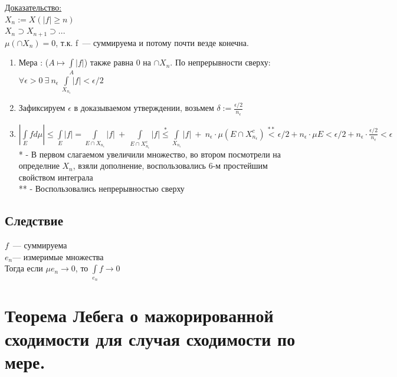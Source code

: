 \documentclass[paper=a4, fontsize=17pt]{article}
\begin{document}
\underline{Доказательство:} \\
$X_n := X(|f| \geq n)$\\
$X_n \supset X_{n+1} \supset ...$\\
$\mu(\cap X_n) = 0$, т.к. f~--- суммируема и потому почти везде конечна.
\begin{enumerate}
	\item Мера : ($A \mapsto \int\limits_{A}|f|$) также равна $0$ на $\cap X_n$. По непрерывности сверху:
	$\forall \epsilon > 0 ~ \exists ~ n_{\epsilon} ~ \int\limits_{X_{n_{\epsilon}}}|f| < \epsilon / 2$
	\item Зафиксируем $\epsilon$ в доказываемом утверждении, возьмем $\delta := \frac{\epsilon / 2}{n_{\epsilon}}$
	\item $|\int\limits_{E}f d\mu| \leq \int\limits_{E} |f| = \int\limits_{E \cap X_{n_{\epsilon}}}|f| ~+~ \int\limits_{E \cap X_{n_{\epsilon}}^c}|f| \overset{*}{\leq} \int\limits_{X_{n_{\epsilon}}}|f| ~+~ n_{\epsilon} \cdot \mu (E \cap X_{n_{\epsilon}}^c) \overset{**}{<} \epsilon / 2 + n_\epsilon \cdot \mu E < \epsilon / 2 + n_\epsilon \cdot \frac{\epsilon / 2}{n_{\epsilon}} < \epsilon$ \\
	* - В первом слагаемом увеличили множество, во втором посмотрели на определние $X_n$, взяли дополнение, воспользовались 6-м простейшим свойством интеграла\\
	** - Воспользовались непрерывностью сверху
\end{enumerate}
	\subsection{Следствие}
	$f$~--- суммируема\\
	$e_n$--- измеримые множества\\

	Тогда если $\mu e_n \rightarrow 0$, то $\int\limits_{e_n}f \rightarrow 0$
\section{Теорема Лебега о мажорированной сходимости для случая сходимости по мере.}
\end{document}

